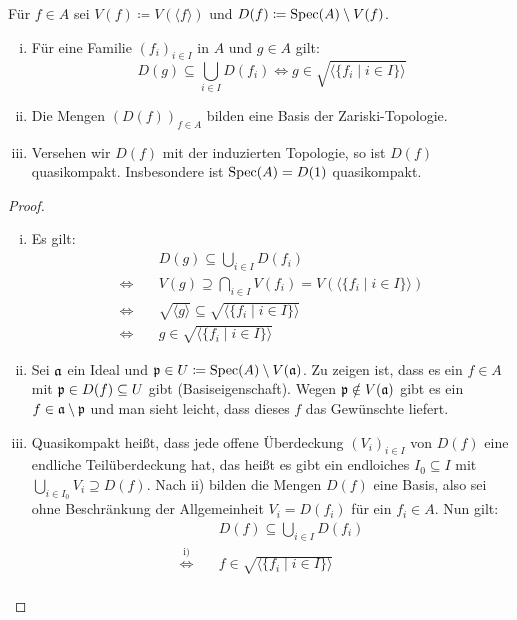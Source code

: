 \begin{prop}
\label{prop:4.8}
	Für $f \in A$ sei $V(f) \coloneqq V(\langle f \rangle)$ und $D(f)\coloneqq \operatorname{Spec}(A) \setminus V(f)$.
	\begin{enumerate}[i)]
		\item Für eine Familie $(f_i)_{i\in I}$ in $A$ und $g \in A$ gilt:
		\[
			D(g) \subseteq \bigcup_{i\in I}D(f_i) \Leftrightarrow g \in \sqrt{\langle \{f_i \mid i \in I\}\rangle}
		\]
		\item Die Mengen $(D(f))_{f\in A}$ bilden eine Basis der Zariski-Topologie.
		\item Versehen wir $D(f)$ mit der induzierten Topologie, so ist $D(f)$ quasikompakt. Insbesondere ist $\operatorname{Spec}(A)=D(1)$ quasikompakt.
	\end{enumerate}
	\begin{proof}
		\begin{enumerate}[i)]
			\item Es gilt:
			\begin{align*}
				&D(g) \subseteq \bigcup_{i\in I} D(f_i)\\
				\Longleftrightarrow \quad & V(g) \supseteq \bigcap_{i \in I} V(f_i) = V(\langle\{f_i\mid i \in I\}\rangle)\\
				\Longleftrightarrow \quad & \sqrt{\langle g \rangle} \subseteq \sqrt{\langle\{f_i\mid i \in I\}\rangle}\\
				\Longleftrightarrow \quad & g \in \sqrt{\langle\{f_i\mid i \in I\}\rangle}
			\end{align*}
			\item Sei $\mathfrak{a}$ ein Ideal und $\mathfrak{p} \in U \coloneqq \operatorname{Spec}(A) \setminus V(\mathfrak{a})$. Zu zeigen ist, dass es ein $f \in A$ mit $\mathfrak{p} \in D(f) \subseteq U$ gibt (Basiseigenschaft). Wegen $\mathfrak{p} \notin V(\mathfrak{a})$ gibt es ein $f \in \mathfrak{a} \setminus \mathfrak{p}$ und man sieht leicht, dass dieses $f$ das Gewünschte liefert.
			\item Quasikompakt heißt, dass jede offene Überdeckung $(V_i)_{i\in I}$ von $D(f)$ eine endliche Teilüberdeckung hat, das heißt es gibt ein endloiches $I_0 \subseteq I$ mit $\bigcup_{i\in I_0} V_i \supseteq D(f)$. Nach ii) bilden die Mengen $D(f)$ eine Basis, also sei ohne Beschränkung der Allgemeinheit $V_i = D(f_i)$ für ein $f_i \in A$. Nun gilt:
			\begin{align*}
				&D(f) \subseteq \bigcup_{i \in I} D(f_i)\\
				\overset{\text{i)}}{\Longleftrightarrow} \quad & f \in \sqrt{\langle \{f_i \mid i \in I\}\rangle}\\

\end{align*}
\end{enumerate}
\end{proof}
\end{prop}
